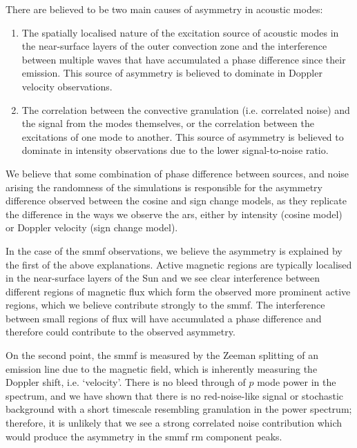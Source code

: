 There are believed to be two main causes of asymmetry in acoustic modes:

\begin{enumerate}
	\item{The spatially localised nature of the excitation source of acoustic modes in the near-surface layers of the outer convection zone and the interference between multiple waves that have accumulated a phase difference since their emission. This source of asymmetry is believed to dominate in Doppler velocity observations.}
	
	\item{The correlation between the convective granulation (i.e. correlated noise) and the signal from the modes themselves, or the correlation between the excitations of one mode to another. This source of asymmetry is believed to dominate in intensity observations due to the lower signal-to-noise ratio.}
\end{enumerate}

We believe that some combination of phase difference between sources, and noise arising the randomness of the simulations is responsible for the asymmetry difference observed between the cosine and sign change models, as they replicate the difference in the ways we observe the \glspl{ar}, either by intensity (cosine model) or Doppler velocity (sign change model).

In the case of the \gls{smmf} observations, we believe the asymmetry is explained by the first of the above explanations. Active magnetic regions are typically localised in the near-surface layers of the Sun and we see clear interference between different regions of magnetic flux which form the observed more prominent active regions, which we believe contribute strongly to the \gls{smmf}. The interference between small regions of flux will have accumulated a phase difference and therefore could contribute to the observed asymmetry.

On the second point, the \gls{smmf} is measured by the Zeeman splitting of an emission line due to the magnetic field, which is inherently measuring the Doppler shift, i.e. `velocity'. There is no bleed through of $p$ mode power in the spectrum, and we have shown that there is no red-noise-like signal or stochastic background with a short timescale resembling granulation in the power spectrum; therefore, it is unlikely that we see a strong correlated noise contribution which would produce the asymmetry in the \gls{smmf} \gls{rm} component peaks.

